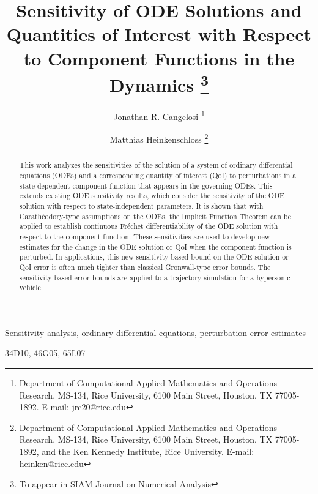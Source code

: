 \documentclass[onefignum,onetabnum]{siamart220329}
\title{Sensitivity of ODE Solutions and Quantities of Interest with Respect to Component Functions in the Dynamics
        \thanks{To appear in SIAM Journal on Numerical Analysis
       \funding{This research was supported in part by AFOSR Grant FA9550-22-1-0004 and NSF Grant DMS-2231482.}
       }}
\author{Jonathan R. Cangelosi
             \thanks{Department of Computational Applied Mathematics and Operations Research,
                      MS-134, Rice University, 6100 Main Street,
                     Houston, TX 77005-1892. 
                     E-mail: jrc20@rice.edu}
             \and
             Matthias Heinkenschloss
             \thanks{Department of Computational Applied Mathematics and Operations Research,
                 MS-134, Rice University, 6100 Main Street,
                 Houston, TX 77005-1892, and the Ken Kennedy Institute, Rice University.
                 E-mail: heinken@rice.edu}
        }
\numberwithin{equation}{section}
\begin{document}
\maketitle


\begin{abstract}
This work analyzes the sensitivities of the solution of a system of ordinary differential equations (ODEs) and a corresponding quantity of interest (QoI) to perturbations in a state-dependent component function that appears in the governing ODEs. This extends existing ODE sensitivity results, which consider the sensitivity of the ODE solution with respect to state-independent parameters. It is shown that with Carath\'eodory-type assumptions on the ODEs, the Implicit Function Theorem can be applied to establish continuous Fr\'echet differentiability of the ODE solution with respect to the component function. These sensitivities are used to develop new estimates for the change in the ODE solution or QoI when the component function is perturbed. In applications, this new sensitivity-based bound on the ODE solution or QoI error is often much tighter than classical Gronwall-type error bounds. The sensitivity-based error bounds are applied to a trajectory simulation for a hypersonic vehicle.
\end{abstract}

\begin{keywords}
    Sensitivity analysis, 
    ordinary differential equations,
    perturbation error estimates
\end{keywords}

\begin{MSCcodes}   %
 	34D10,
	46G05,
	65L07 	
\end{MSCcodes}

%
\end{document}
